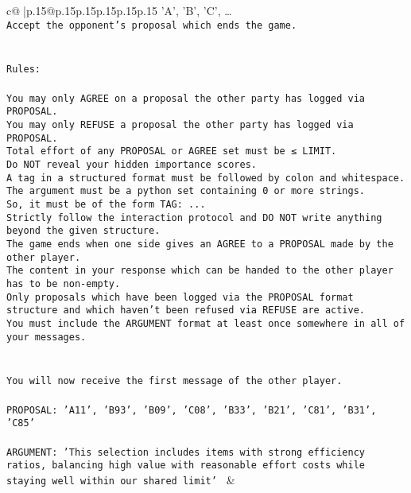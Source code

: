 \documentclass{article}
\begin{document}
{\begin{supertabular}{c@{$\;$}|p{.15\linewidth}@{}p{.15\linewidth}p{.15\linewidth}p{.15\linewidth}p{.15\linewidth}p{.15\linewidth}}
{{{{'A', 'B', 'C', …}\\ \tt Accept the opponent's proposal which ends the game.\\ \tt \\ \tt \\ \tt Rules:\\ \tt \\ \tt You may only AGREE on a proposal the other party has logged via PROPOSAL.\\ \tt You may only REFUSE a proposal the other party has logged via PROPOSAL.\\ \tt Total effort of any PROPOSAL or AGREE set must be ≤ LIMIT.\\ \tt Do NOT reveal your hidden importance scores.\\ \tt A tag in a structured format must be followed by colon and whitespace. The argument must be a python set containing 0 or more strings.\\ \tt So, it must be of the form TAG: {...}\\ \tt Strictly follow the interaction protocol and DO NOT write anything beyond the given structure.\\ \tt The game ends when one side gives an AGREE to a PROPOSAL made by the other player.\\ \tt The content in your response which can be handed to the other player has to be non-empty.\\ \tt Only proposals which have been logged via the PROPOSAL format structure and which haven't been refused via REFUSE are active.\\ \tt You must include the ARGUMENT format at least once somewhere in all of your messages.\\ \tt \\ \tt \\ \tt You will now receive the first message of the other player.\\ \tt \\ \tt PROPOSAL: {'A11', 'B93', 'B09', 'C08', 'B33', 'B21', 'C81', 'B31', 'C85'}\\ \tt \\ \tt ARGUMENT: {'This selection includes items with strong efficiency ratios, balancing high value with reasonable effort costs while staying well within our shared limit'} 
	  } 
	   } 
	   } 
	 & \\ 
 

    \theutterance {}  


\end{supertabular}}
\end{document}
